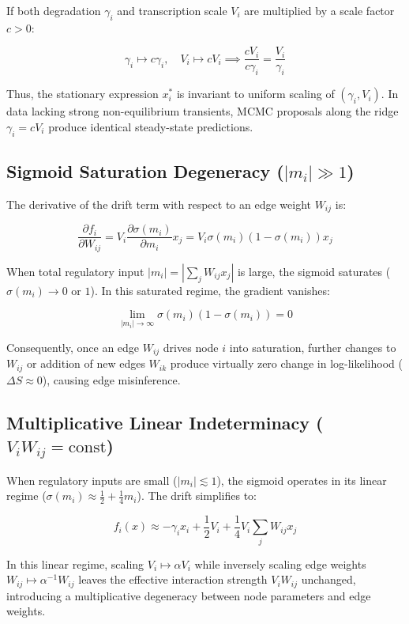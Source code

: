 \documentclass[10pt, aps, rmp,  twocolumn, superscriptaddress, floatfix, showkeys]{revtex4-2}
\begin{document}
If both degradation $\gamma_i$ and transcription scale $V_i$ are multiplied by a scale factor $c > 0$:

$$\gamma_i \mapsto c \gamma_i, \quad V_i \mapsto c V_i \implies \frac{cV_i}{c\gamma_i} = \frac{V_i}{\gamma_i}$$

Thus, the stationary expression $x_i^*$ is invariant to uniform scaling of $(\gamma_i, V_i)$. In data lacking strong non-equilibrium transients, MCMC proposals along the ridge $\gamma_i = c V_i$ produce identical steady-state predictions.

\subsection{Sigmoid Saturation Degeneracy ($|m_i| \gg 1$)}

The derivative of the drift term with respect to an edge weight $W_{ij}$ is:

$$\frac{\partial f_i}{\partial W_{ij}} = V_i \frac{\partial \sigma(m_i)}{\partial m_i} x_j = V_i \sigma(m_i)\left(1 - \sigma(m_i)\right) x_j$$

When total regulatory input $|m_i| = \left|\sum_j W_{ij} x_j\right|$ is large, the sigmoid saturates ($\sigma(m_i) \to 0$ or $1$). In this saturated regime, the gradient vanishes:

$$\lim_{|m_i| \to \infty} \sigma(m_i)(1 - \sigma(m_i)) = 0$$

Consequently, once an edge $W_{ij}$ drives node $i$ into saturation, further changes to $W_{ij}$ or addition of new edges $W_{ik}$ produce virtually zero change in log-likelihood ($\Delta S \approx 0$), causing edge misinference.

\subsection{Multiplicative Linear Indeterminacy ($V_i W_{ij} = \text{const}$)}

When regulatory inputs are small ($|m_i| \lesssim 1$), the sigmoid operates in its linear regime ($\sigma(m_i) \approx \frac{1}{2} + \frac{1}{4} m_i$). The drift simplifies to:

$$f_i(x) \approx -\gamma_i x_i + \frac{1}{2} V_i + \frac{1}{4} V_i \sum_j W_{ij} x_j$$

In this linear regime, scaling $V_i \mapsto \alpha V_i$ while inversely scaling edge weights $W_{ij} \mapsto \alpha^{-1} W_{ij}$ leaves the effective interaction strength $V_i W_{ij}$ unchanged, introducing a multiplicative degeneracy between node parameters and edge weights.
\end{document}
